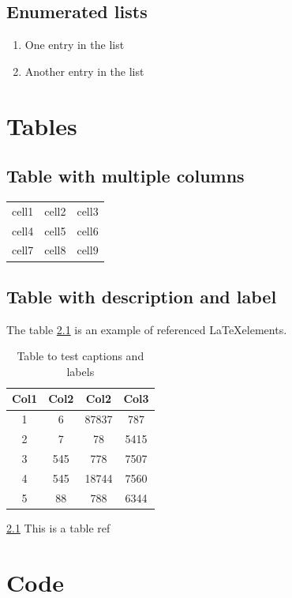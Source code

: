 \documentclass{book}
\begin{document}
\section{ Enumerated lists}
\begin{enumerate}
  \item One entry in the list
  \item Another entry in the list
\end{enumerate}

\chapter{Tables}
\section{Table with multiple columns}
\begin{center}
\begin{tabular}{ |c|c|c| } 
 \hline
 cell1 & cell2 & cell3 \\ 
 cell4 & cell5 & cell6 \\ 
 cell7 & cell8 & cell9 \\ 
 \hline
\end{tabular}
\end{center}

\section{Table with description and label}
The table \ref{table:1} is an example of referenced \LaTeX elements.

\begin{table}[h!]
\centering
\begin{tabular}{||c c c c||} 
 \hline
 Col1 & Col2 & Col2 & Col3 \\ [0.5ex] 
 \hline\hline
 1 & 6 & 87837 & 787 \\ 
 2 & 7 & 78 & 5415 \\
 3 & 545 & 778 & 7507 \\
 4 & 545 & 18744 & 7560 \\
 5 & 88 & 788 & 6344 \\ [1ex] 
 \hline
\end{tabular}
\caption{Table to test captions and labels}
\label{table:1}
\end{table}

\ref{table:1} This is a table ref

\chapter{Code}
\end{document}

